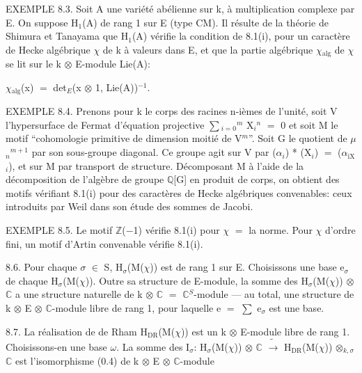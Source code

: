 \documentclass[10pt,twoside]{article}
\begin{document}
EXEMPLE 8.3. Soit A une variété abélienne sur k, à multiplication complexe par E. On suppose H\ensuremath{_{1}}(A) de rang 1 sur E (type CM). Il résulte de la théorie de Shimura et Tanayama que H\ensuremath{_{1}}(A) vérifie la condition de 8.1(i), pour un caractère de Hecke algébrique \ensuremath{χ} de k à valeurs dans E, et que la partie algébrique \ensuremath{χ}\ensuremath{_{\mathrm{alg}}} de \ensuremath{χ} se lit sur le k \ensuremath{⊗} E-module Lie(A):\par
\ensuremath{χ}\ensuremath{_{\mathrm{alg}}}(x) \ensuremath{=} det\ensuremath{_{E}}(x \ensuremath{⊗} 1, Lie(A))\ensuremath{^{-1}}.\par
EXEMPLE 8.4. Prenons pour k le corps des racines n-ièmes de l’unité, soit V l’hypersurface de Fermat d’équation projective \ensuremath{∑}\ensuremath{_{i=0}}\ensuremath{^{m}} X\ensuremath{_{i}}\ensuremath{^{n}} \ensuremath{=} 0 et soit M le motif “cohomologie primitive de dimension moitié de V\ensuremath{^{m}}”. Soit G le quotient de \ensuremath{μ}\ensuremath{_{n}}\ensuremath{^{m+1}} par son sous-groupe diagonal. Ce groupe agit sur V par (\ensuremath{α}\ensuremath{_{i}}) * (X\ensuremath{_{i}}) \ensuremath{=} (\ensuremath{α}\ensuremath{_{\mathrm{iX}}}\ensuremath{_{i}}), et sur M par transport de structure. Décomposant M à l’aide de la décomposition de l’algèbre de groupe \ensuremath{ℚ}[G] en produit de corps, on obtient des motifs vérifiant 8.1(i) pour des caractères de Hecke algébriques convenables: ceux introduits par Weil dans son étude des sommes de Jacobi.\par
EXEMPLE 8.5. Le motif \ensuremath{ℤ}(\ensuremath{−}1) vérifie 8.1(i) pour \ensuremath{χ} \ensuremath{=} la norme. Pour \ensuremath{χ} d’ordre fini, un motif d’Artin convenable vérifie 8.1(i).\par
8.6. Pour chaque \ensuremath{σ} \ensuremath{∈} S, H\ensuremath{_{σ}}(M(\ensuremath{χ})) est de rang 1 sur E. Choisissons une base e\ensuremath{_{σ}} de chaque H\ensuremath{_{σ}}(M(\ensuremath{χ})). Outre sa structure de E-module, la somme des H\ensuremath{_{σ}}(M(\ensuremath{χ})) \ensuremath{⊗} \ensuremath{ℂ} a une structure naturelle de k \ensuremath{⊗} \ensuremath{ℂ} \ensuremath{=} \ensuremath{ℂ}\ensuremath{^{S}}-module — au total, une structure de k \ensuremath{⊗} E \ensuremath{⊗} \ensuremath{ℂ}-module libre de rang 1, pour laquelle e \ensuremath{=} \ensuremath{∑} e\ensuremath{_{σ}} est une base.\par
8.7. La réalisation de de Rham H\ensuremath{_{\mathrm{DR}}}(M(\ensuremath{χ})) est un k \ensuremath{⊗} E-module libre de rang 1. Choisissons-en une base \ensuremath{ω}. La somme des I\ensuremath{_{σ}}: H\ensuremath{_{σ}}(M(\ensuremath{χ})) \ensuremath{⊗} \ensuremath{ℂ} \ensuremath{\widetilde{→}} H\ensuremath{_{\mathrm{DR}}}(M(\ensuremath{χ})) \ensuremath{⊗}\ensuremath{_{k,σ}} \ensuremath{ℂ} est l’isomorphisme (0.4) de k \ensuremath{⊗} E \ensuremath{⊗} \ensuremath{ℂ}-module\par
\end{document}
